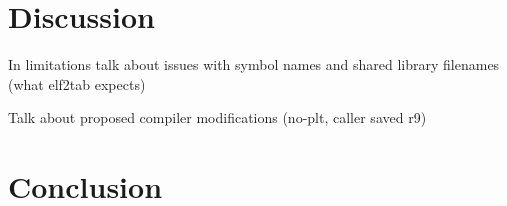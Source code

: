 \documentclass{article}
\begin{document}
\section*{Discussion}
In limitations talk about issues with symbol names and shared library filenames (what elf2tab expects)

Talk about proposed compiler modifications (no-plt, caller saved r9)

\section*{Conclusion}

%
\end{document}
